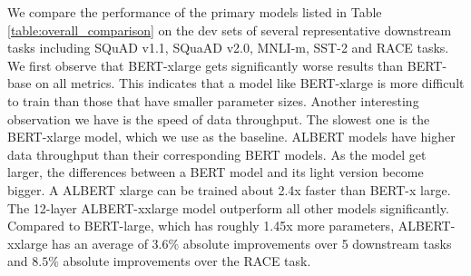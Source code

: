We compare the performance of the primary models listed in Table \ref{table:overall_comparison} on the dev sets of several representative downstream tasks including SQuAD v1.1, SQuaAD v2.0, MNLI-m, SST-2 and RACE tasks. We first observe that BERT-xlarge gets significantly worse results than BERT-base on all metrics. This indicates that a model like BERT-xlarge is more difficult to train than those that have smaller parameter sizes. 
Another interesting observation we have is the speed of data throughput. The slowest one is the BERT-xlarge model, which we use as the baseline. ALBERT models have higher data throughput than their corresponding BERT models. As the model get larger, the differences between a BERT model and its light version become bigger. A ALBERT xlarge can be trained about 2.4x faster than BERT-x large. The 12-layer ALBERT-xxlarge model outperform all other models significantly. Compared to BERT-large, which has roughly 1.45x more parameters, ALBERT-xxlarge has an average of $3.6\%$ absolute improvements over 5 downstream tasks and $8.5\%$ absolute improvements over the RACE task. 
